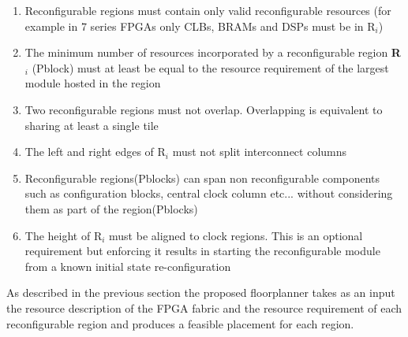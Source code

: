 \begin{enumerate}
\item Reconfigurable regions must contain only valid reconfigurable resources (for example in 7 series FPGAs only CLBs, BRAMs and DSPs must be in R$_i$)
\item The minimum number of resources incorporated by a reconfigurable region \textbf{R$_i$} (Pblock) must at least be equal to the resource requirement of the largest module hosted in the region

\item Two reconfigurable regions must not overlap. Overlapping is equivalent to sharing at least a single tile

\item The left and right edges of R$_i$ must not split interconnect columns 

\item Reconfigurable regions(Pblocks) can span non reconfigurable components such as configuration blocks, central clock column etc... without considering them as part of the region(Pblocks)

\item The height of R$_i$ must be aligned to clock regions. This is an optional requirement but enforcing it results in starting the reconfigurable module from a known initial state re-configuration

\end{enumerate}

As described in the previous section the proposed floorplanner takes as an input the resource description of the FPGA fabric and the resource requirement of each reconfigurable region and produces a feasible placement for each region.


\begin{comment}
The central clock column divides the FPGA into left and right regions as shown in the figure. But all the horizontally adjacent clock regions are combined into a single clock region to make the x axis W units wide. The y axis is H units high. Combining horizontally adjacent clock regions into a single clock region does

Reconfigurable regions need not necessarily be rectangular but assigning rectangular shapes to regions greatly reduces routing and placement challenges

The bit files are deployed in the FPGA configuration memory. 
\end{comment}